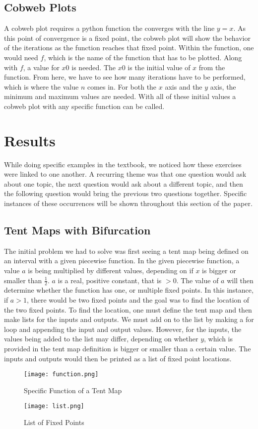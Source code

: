 \documentclass{article}
\begin{document}
\subsection{Cobweb Plots}
A cobweb plot requires a python function the converges with the line $y=x$. As this point of convergence is a fixed point, the cobweb plot will show the behavior of the iterations as the function reaches that fixed point. Within the function, one would need $f$, which is the name of the function that has to be plotted. Along with $f$, a value for $x0$ is needed. The $x0$ is the initial value of $x$ from the function. From here, we have to see how many iterations have to be performed, which is where the value $n$ comes in. For both the $x$ axis and the $y$ axis, the minimum and maximum values are needed. With all of these initial values a cobweb plot with any specific function can be called. \cite{shapiro2018scientific}

\section{Results}
While doing specific examples in the textbook, we noticed how these exercises were linked to one another. A recurring theme was that one question would ask about one topic, the next question would ask about a different topic, and then the following question would bring the previous two questions together. Specific instances of these occurrences will be shown throughout this section of the paper. 

\subsection{Tent Maps with Bifurcation}
The initial problem we had to solve was first seeing a tent map being defined on an interval with a given piecewise function. In the given piecewise function, a value $a$ is being multiplied by different values, depending on if $x$ is bigger or smaller than $\frac{1}{2}$. $a$ is a real, positive constant, that is $>0$. The value of $a$ will then determine whether the function has one, or multiple fixed points. In this instance, if $a>1$, there would be two fixed points and the goal was to find the location of the two fixed points. To find the location, one must define the tent map and then make lists for the inputs and outputs. We must add on to the list by making a for loop and appending the input and output values. However, for the inputs, the values being added to the list may differ, depending on whether $y$, which is provided in the tent map definition is bigger or smaller than a certain value. The inputs and outputs would then be printed as a list of fixed point locations. 
\begin{figure}[htp]
    \centering
    \texttt{[image: function.png]}
    \caption{Specific Function of a Tent Map}
    \label{fig:Tent Map Function}
\end{figure}
\begin{figure}[htp]
    \centering
    \texttt{[image: list.png]}
    \caption{List of Fixed Points}
    \label{fig:Tent Map Fixed Point List}
\end{figure}
\end{document}
